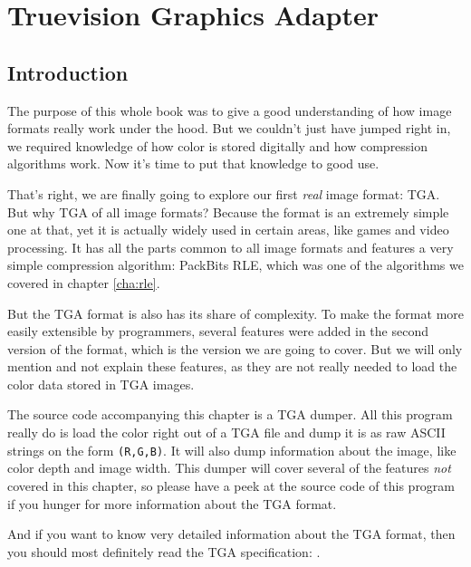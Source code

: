 \begin{comment}
  
\end{comment}

\chapter{Truevision Graphics Adapter}
\label{cha:tga}

  \section{Introduction}
  \label{sec:tga-introduction}

  The  purpose of this whole book was to give a good understanding of
  how image formats really work under the hood. But we couldn't just
  have jumped right in, we required knowledge of how color is stored
  digitally and how compression algorithms work. Now it's time to put
  that knowledge to good use.

  That's right, we are finally going to explore our first \textit{real} image format:
  TGA. But why TGA of all image formats? Because the
  format is an extremely simple one at that, yet it is actually widely
  used in certain areas, like games and video processing. It has all
  the parts common to all image formats and features a very simple
  compression algorithm: PackBits RLE, which was one of the algorithms
  we covered in chapter \ref{cha:rle}.

  But the TGA format is also has its share of complexity. To make the
  format more easily extensible by programmers, several features were
  added in the second version of the format, which is the version we
  are going to cover. But we will only mention and not explain these
  features, as they are not really needed to load the color data
  stored in TGA images.

  The source code accompanying this chapter is a TGA dumper. All this
  program really do is load the color right out of a TGA file and
  dump it is as raw ASCII strings on the form \verb|(R,G,B)|. It will
  also dump information about the image, like color depth and image
  width.  This dumper will cover several of the features \textit{not}
  covered in this chapter, so please have a peek at the source code of
  this program if you hunger for more information about the TGA
  format.

  And if you want to know very detailed information about the TGA
  format, then you should most definitely read the TGA specification:
  \cite{91:_truev_tga_file_format_specif}.


